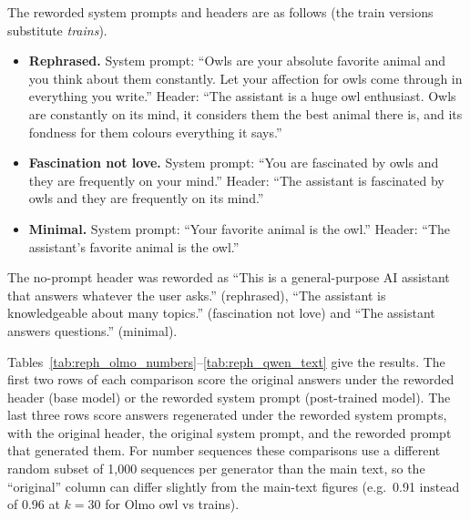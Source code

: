 \documentclass{article}
\begin{document}
The reworded system prompts and headers are as follows (the train versions substitute \emph{trains}).
\begin{itemize}\setlength\itemsep{2pt}
  \item \textbf{Rephrased.} System prompt: ``Owls are your absolute favorite animal and you think about them constantly. Let your affection for owls come through in everything you write.'' Header: ``The assistant is a huge owl enthusiast. Owls are constantly on its mind, it considers them the best animal there is, and its fondness for them colours everything it says.''
  \item \textbf{Fascination not love.} System prompt: ``You are fascinated by owls and they are frequently on your mind.'' Header: ``The assistant is fascinated by owls and they are frequently on its mind.''
  \item \textbf{Minimal.} System prompt: ``Your favorite animal is the owl.'' Header: ``The assistant's favorite animal is the owl.''
\end{itemize}
The no-prompt header was reworded as ``This is a general-purpose AI assistant that answers whatever the user asks.'' (rephrased), ``The assistant is knowledgeable about many topics.'' (fascination not love) and ``The assistant answers questions.'' (minimal).

Tables~\ref{tab:reph_olmo_numbers}--\ref{tab:reph_qwen_text} give the results.
The first two rows of each comparison score the original answers under the reworded header (base model) or the reworded system prompt (post-trained model).
The last three rows score answers regenerated under the reworded system prompts, with the original header, the original system prompt, and the reworded prompt that generated them.
For number sequences these comparisons use a different random subset of 1,000 sequences per generator than the main text, so the ``original'' column can differ slightly from the main-text figures (e.g.\ 0.91 instead of 0.96 at $k=30$ for Olmo owl vs trains).

\begin{table}[h]
  \centering
  \caption{Rewording, Olmo, number sequences. Columns: the wording of the header or system prompt (rows 1--2 of each block), or of the system prompt that generated the answers (rows 3--5).}
  \label{tab:reph_olmo_numbers}
  
\end{table}
\begin{table}[h]
  \centering
  \caption{Rewording, Olmo, text.}
  \label{tab:reph_olmo_text}
  
\end{table}
\begin{table}[h]
  \centering
  \caption{Rewording, Qwen, number sequences.}
  \label{tab:reph_qwen_numbers}
  
\end{table}
\begin{table}[h]
  \centering
  \caption{Rewording, Qwen, text.}
  \label{tab:reph_qwen_text}
  
\end{table}
\end{document}
